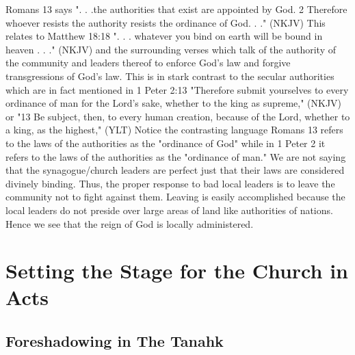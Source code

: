 \documentclass[11pt]{article}
\begin{document}
Romans 13 says ". . .the authorities that exist are appointed by God. 2 Therefore whoever resists the authority resists the ordinance of God. . ." (NKJV) This relates to Matthew 18:18 ". . . whatever you bind on earth will be bound in heaven . . ." (NKJV) and the surrounding verses which talk of the authority of the community and leaders thereof to enforce God's law and forgive transgressions of God's law. This is in stark contrast to the secular authorities which are in fact mentioned in 1 Peter 2:13 "Therefore submit yourselves to every ordinance of man for the Lord’s sake, whether to the king as supreme," (NKJV) or "13 Be subject, then, to every human creation, because of the Lord, whether to a king, as the highest," (YLT) Notice the contrasting language Romans 13 refers to the laws of the authorities as the "ordinance of God" while in 1 Peter 2 it refers to the laws of the authorities as the "ordinance of man." We are not saying that the synagogue/church leaders are perfect just that their laws are considered divinely binding. Thus, the proper response to bad local leaders is to leave the community not to fight against them. Leaving is easily accomplished because the local leaders do not preside over large areas of land like authorities of nations. Hence we see that the reign of God is locally administered.


\section{Setting the Stage for the Church in Acts}

\subsection{Foreshadowing in The Tanahk} \label{foreshadowing in the tanahk}
\end{document}
